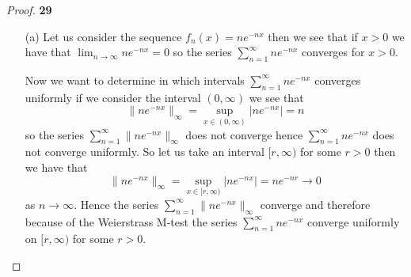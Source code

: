\documentclass[11pt]{article}
\theoremstyle{definition}
\begin{document}
\cleardoublepage
\begin{proof}{\textbf{29}}
\begin{itemize}
    \item [(a)] Let us consider the sequence $f_n(x) = ne^{-nx}$ then we see
    that if $x > 0$ we have that $\lim_{n\to\infty} ne^{-nx} = 0$ so the series
    $\sum_{n=1}^\infty ne^{-nx}$ converges for $x > 0$.

    Now we want to determine in which intervals $\sum_{n=1}^\infty ne^{-nx}$
    converges uniformly if we consider the interval $(0, \infty)$ we see
    that
    $$\|ne^{-nx}\|_\infty = \sup_{x \in (0,\infty)}{|ne^{-nx}|} = n$$
    so the series $\sum_{n=1}^\infty \|ne^{-nx}\|_\infty$ does not converge
    hence $\sum_{n=1}^\infty ne^{-nx}$ does not converge uniformly.
    So let us take an interval $[r, \infty)$ for some $r > 0$
    then we have that 
    $$\|ne^{-nx}\|_\infty = \sup_{x \in [r,\infty)}{|ne^{-nx}|} = ne^{-nr} \to 0$$
    as $n \to \infty$. Hence the series $\sum_{n=1}^\infty \|ne^{-nx}\|_\infty$
    converge and therefore because of the Weierstrass M-test the series 
    $\sum_{n=1}^\infty ne^{-nx}$ converge uniformly
    on $[r, \infty)$ for some $r > 0$.


\end{itemize}
\end{proof}
\end{document}
